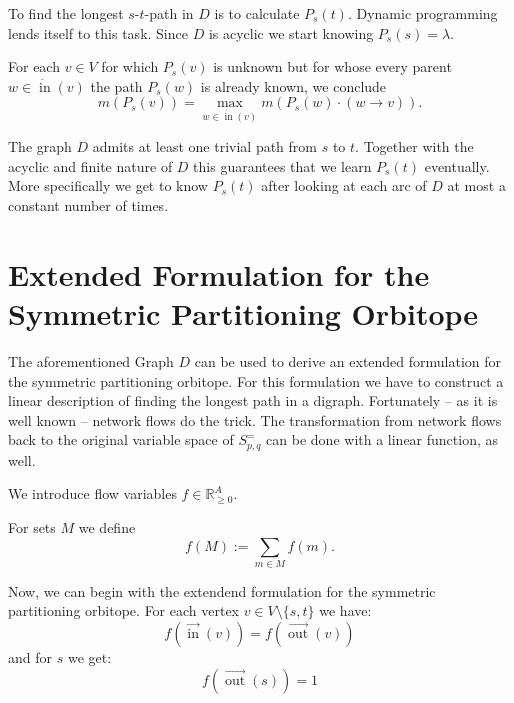 \documentclass{amsart}
\theoremstyle{definition}
\DeclareMathOperator{\In}{in}
\DeclareMathOperator{\Out}{out}
\newcommand{\ina}{\ensuremath{\vec{\In}}}
\newcommand{\outa}{\ensuremath{\vec{\Out}}}
\newcommand{\inv}{\ensuremath{\dot{\In}}}
\begin{document}
To find the longest \(s\)-\(t\)-path in \(D\) is to calculate
\(P_s (t)\).  Dynamic programming lends itself to this task.  Since
\(D\) is acyclic we start knowing \(P_s (s) = \lambda\).

For each \(v \in V\) for which \(P_s (v)\) is unknown but for whose
every parent \(w \in \inv(v)\) the path \(P_s (w)\) is already known,
we conclude
\[m\left(P_s \left(v\right)\right) = \max_{w \in \inv(v)}
m\left(P_s(w) \cdot \left(w \rightarrow v \right) \right)\text{.}\]

The graph \(D\) admits at least one trivial path from \(s\) to \(t\).
Together with the acyclic and finite nature of \(D\) this guarantees that we
learn \(P_s (t)\) eventually.  More specifically we get to know \(P_s
(t)\) after looking at each arc of \(D\) at most a constant number of
times.





\section{Extended Formulation for the Symmetric Partitioning Orbitope}
The aforementioned Graph \(D\) can be used to derive an extended
formulation for the  symmetric partitioning orbitope.  For this
formulation we have to construct a linear description of finding the
longest path in a digraph.  Fortunately -- as it is well known --
network flows do the trick.  The transformation from network flows
back to the original variable space of \(S^=_{p,q}\) can be done with
a linear function, as well.

We introduce flow variables \(f \in \mathbb{R}^A_{\geq 0}\).  

For sets \(M\) we define
\[f (M) := \sum_{m\in M} f(m)\text{.}\]

Now, we can begin with the extendend formulation for the 
symmetric partitioning orbitope.  For each vertex \(v \in V \setminus
\{s,t\}\) we have:
\begin{equation}
f\left(\ina(v)\right) = f\left(\outa(v)\right)
\end{equation}
and for \(s\) we get:
\begin{equation}
f\left(\outa(s)\right) = 1
\end{equation}
\end{document}
